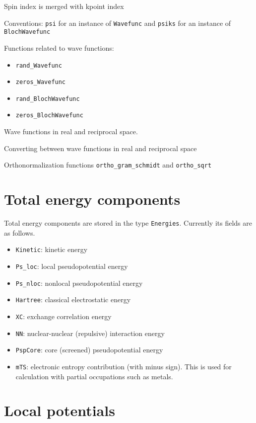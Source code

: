 \documentclass[a4paper,10pt,twocolumn]{paper}
\newcommand{\jlcode}[1]{\texttt{#1}}
\begin{document}
Spin index is merged with kpoint index

Conventions: \jlcode{psi} for an instance of \jlcode{Wavefunc} and
\jlcode{psiks} for an instance of \jlcode{BlochWavefunc}

Functions related to wave functions:
\begin{itemize}
\item \jlcode{rand_Wavefunc}
\item \jlcode{zeros_Wavefunc}
\item \jlcode{rand_BlochWavefunc}
\item \jlcode{zeros_BlochWavefunc}
\end{itemize}

Wave functions in real and reciprocal space.

Converting between wave functions in real and reciprocal space

Orthonormalization functions
\jlcode{ortho_gram_schmidt} and \jlcode{ortho_sqrt}


\section{Total energy components}

Total energy components are stored in the type \jlcode{Energies}. Currently its
fields are as follows.
\begin{itemize}
%
\item \jlcode{Kinetic}: kinetic energy
%
\item \jlcode{Ps_loc}: local pseudopotential energy
%
\item \jlcode{Ps_nloc}: nonlocal pseudopotential energy
%
\item \jlcode{Hartree}: classical electrostatic energy
%
\item \jlcode{XC}: exchange correlation energy
%
\item \jlcode{NN}: nuclear-nuclear (repulsive) interaction energy
%
\item \jlcode{PspCore}: core (screened) pseudopotential energy
%
\item \jlcode{mTS}: electronic entropy contribution (with minus sign). This is
  used for calculation with partial occupations such as metals.
%
\end{itemize}


\section{Local potentials}
\end{document}
